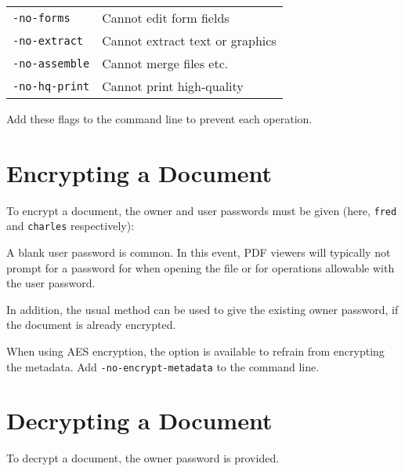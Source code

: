 \documentclass{book}
\begin{document}
   \vspace{2mm}
   \begin{tabular}{ll}
     \texttt{-no-forms} & Cannot edit form fields\\
     \texttt{-no-extract} & Cannot extract text or graphics\\
     \texttt{-no-assemble} & Cannot merge files etc.\\
     \texttt{-no-hq-print} & Cannot print high-quality\\
   \end{tabular}

  \vspace{2mm}
  \noindent Add these flags to the command line to prevent each operation.

  \vspace{2mm}

  \section{Encrypting a Document}
  To encrypt a document, the owner and user passwords must be given (here, \texttt{fred} and \texttt{charles} respectively):

\noindent{}
  \noindent A blank user password is
common. In this event, PDF viewers will typically not prompt for a
password for when opening the file or for operations allowable with the user password.

\noindent{}
\noindent In addition, the usual method can be used to give the existing owner
password, if the document is already encrypted. 

When using AES encryption, the option is available to refrain from encrypting the
metadata. Add \texttt{-no-encrypt-metadata} to the command line.

  \section{Decrypting a Document}
  To decrypt a document, the owner password is provided.
\end{document}
